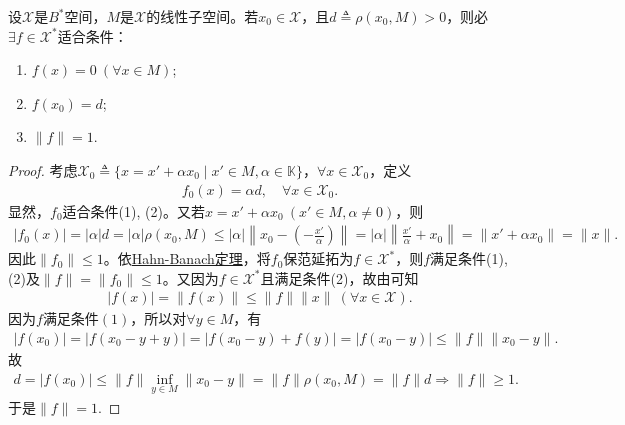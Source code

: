 \documentclass[../../main.tex]{subfiles}%
\begin{document}
\begin{theorem}\label{theorem:泛函分析--零值泛函延拓定理}
设$\mathscr{X}$是$B^*$空间，$M$是$\mathscr{X}$的线性子空间。若$x_0 \in \mathscr{X}$，且$d \triangleq \rho(x_0, M) > 0$，则必$\exists f \in \mathscr{X}^*$适合条件：
\begin{enumerate}[(1)]
\item $f(x) = 0 \ (\forall x \in M)$;
\item $f(x_0) = d$;
\item $\|f\| = 1$.
\end{enumerate}
\end{theorem}
\begin{proof}
考虑$\mathscr{X}_0 \triangleq \{x = x' + \alpha x_0 \mid x' \in M, \alpha \in \mathbb{K}\}$，$\forall x \in \mathscr{X}_0$，定义
\begin{align*}
f_0(x) = \alpha d,\quad \forall x\in \mathscr{X}_0.
\end{align*}
显然，$f_0$适合条件(1), (2)。又若$x = x' + \alpha x_0 \ (x' \in M, \alpha \neq 0)$，则
\begin{align*}
|f_0(x)|=|\alpha |d=|\alpha |\rho (x_0,M)\leqslant |\alpha |\left\| x_0-\left( -\frac{x'}{\alpha} \right) \right\| =|\alpha |\left\| \frac{x'}{\alpha}+x_0 \right\| =\parallel x' +\alpha x_0\parallel =\parallel x\parallel .
\end{align*}
因此$\|f_0\| \leqslant 1$。依\hyperref[theorem:泛函分析--(哈恩-巴拿赫)Hahn-Banach定理]{Hahn-Banach定理}，将$f_0$保范延拓为$f \in \mathscr{X}^*$，则$f$满足条件(1), (2)及$\|f\|=\|f_0\| \leqslant 1$。又因为$f \in \mathscr{X}^*$且满足条件(2)，故由可知
\begin{align*}
|f(x)| = \| f(x) \| \leqslant \| f \| \| x \| \ (\forall x\in \mathscr{X}).
\end{align*}
因为$f$满足条件$(1)$，所以对$\forall y\in M$，有
\begin{align*}
|f(x_0)| = |f(x_0-y+y)| = |f(x_0-y)+f(y)| = |f(x_0-y)| \leqslant \| f \| \| x_0-y \|.
\end{align*}
故
\begin{align*}
d = |f(x_0)| \leqslant \| f \| \inf\limits_{y\in M} \| x_0-y \| = \| f \| \rho(x_0,M) = \| f \| d \Longrightarrow \| f \| \geqslant 1.
\end{align*}
于是$\|f\| = 1$.
\end{proof}
\end{document}
